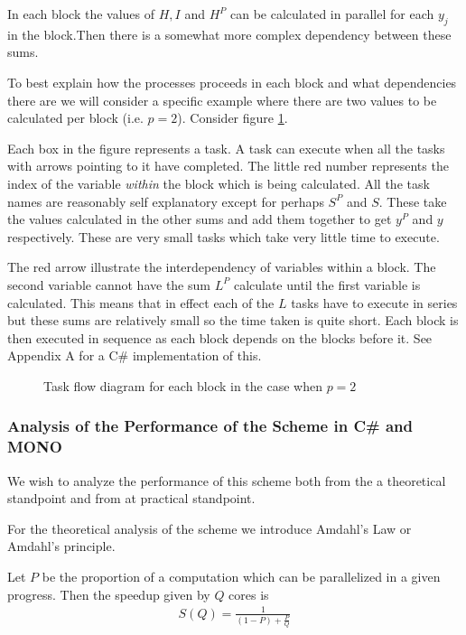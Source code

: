 In each block the values of $ H, I $ and $ H^P $ can be calculated in parallel for each $ y_j $ in the block.Then there is a somewhat more complex dependency between these sums. 

To best explain how the processes proceeds in each block and what dependencies there are we will consider a specific example where there are two values to be calculated per block (i.e. $ p = 2 $). Consider figure \ref{fig:AMB_Task_Flow}. 

Each box in the figure represents a task. A task can execute when all the tasks with arrows pointing to it have completed. The little red number represents the index of the variable \emph{within} the block which is being calculated. All the task names are reasonably self explanatory except for perhaps $ S^P $ and $ S $. These take the values calculated in the other sums and add them together to get $ y^P $ and $ y $ respectively. These are very small tasks which take very little time to execute.

The red arrow illustrate the interdependency of variables within a block. The second variable cannot have the sum $ L^P $ calculate until the first variable is calculated. This means that in effect each of the $ L $ tasks have to execute in series but these sums are relatively small so the time taken is quite short. Each block is then executed in sequence as each block depends on the blocks before it. See Appendix A for a C\# implementation of this. 

\begin{figure}[H]

\caption{Task flow diagram for each block in the case when $ p = 2 $}
\label{fig:AMB_Task_Flow}
\end{figure}

\subsubsection{Analysis of the Performance of the Scheme in C\# and MONO}

We wish to analyze the performance of this scheme both from the a theoretical standpoint and from at practical standpoint. 

For the theoretical analysis of the scheme we introduce Amdahl's Law or Amdahl's principle.
\begin{mdframed}[innertopmargin=10pt]
\begin{principle}[Amdahl]
Let $ P $ be the proportion of a computation which can be parallelized in a given progress. Then the speedup given by
$ Q $ cores is
\begin{align}
	S(Q) = \frac{1}{(1-P)+\frac{P}{Q}}
\end{align}

\end{principle}
\end{mdframed}

